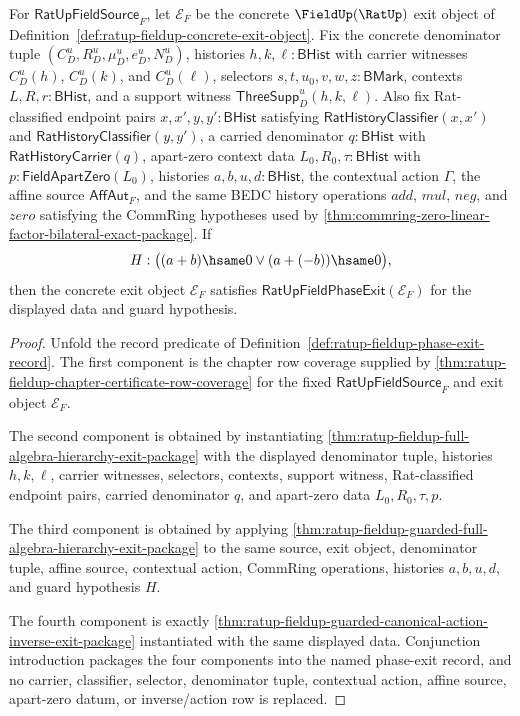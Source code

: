 \begin{theorem}
\label{thm:ratup-fieldup-canonical-phase-exit-record}
For $\mathsf{RatUpFieldSource}_F$, let $\mathcal E_F$ be the concrete
$\FieldUp(\RatUp)$ exit object of
Definition~\ref{def:ratup-fieldup-concrete-exit-object}. Fix the concrete
denominator tuple $(C_D^u,R_D^u,\mu_D^u,e_D^u,N_D^u)$, histories
$h,k,\ell:\mathsf{BHist}$ with carrier witnesses $C_D^u(h)$, $C_D^u(k)$, and
$C_D^u(\ell)$, selectors $s,t,u_0,v,w,z:\mathsf{BMark}$, contexts
$L,R,r:\mathsf{BHist}$, and a support witness
$\mathsf{ThreeSupp}_D^u(h,k,\ell)$. Also fix Rat-classified endpoint pairs
$x,x',y,y':\mathsf{BHist}$ satisfying
$\mathsf{RatHistoryClassifier}(x,x')$ and
$\mathsf{RatHistoryClassifier}(y,y')$, a carried denominator
$q:\mathsf{BHist}$ with $\mathsf{RatHistoryCarrier}(q)$, apart-zero context
data $L_0,R_0,\tau:\mathsf{BHist}$ with
$p:\mathsf{FieldApartZero}(L_0)$, histories $a,b,u,d:\mathsf{BHist}$, the
contextual action $\Gamma$, the affine source $\mathsf{AffAut}_F$, and the same
BEDC history operations $add$, $mul$, $neg$, and $zero$ satisfying the CommRing
hypotheses used by
\autoref{thm:commring-zero-linear-factor-bilateral-exact-package}. If
$$
H:\bigl((a+b)\hsame0 \lor (a+(-b))\hsame0\bigr),
$$
then the concrete exit object $\mathcal E_F$ satisfies
$\mathsf{RatUpFieldPhaseExit}(\mathcal E_F)$ for the displayed data and guard
hypothesis.
\end{theorem}
\begin{proof}
Unfold the record predicate of
Definition~\ref{def:ratup-fieldup-phase-exit-record}. The first component is
the chapter row coverage supplied by
\autoref{thm:ratup-fieldup-chapter-certificate-row-coverage} for the fixed
$\mathsf{RatUpFieldSource}_F$ and exit object $\mathcal E_F$.

The second component is obtained by instantiating
\autoref{thm:ratup-fieldup-full-algebra-hierarchy-exit-package} with the
displayed denominator tuple, histories $h,k,\ell$, carrier witnesses, selectors,
contexts, support witness, Rat-classified endpoint pairs, carried denominator
$q$, and apart-zero data $L_0,R_0,\tau,p$.

The third component is obtained by applying
\autoref{thm:ratup-fieldup-guarded-full-algebra-hierarchy-exit-package} to the
same source, exit object, denominator tuple, affine source, contextual action,
CommRing operations, histories $a,b,u,d$, and guard hypothesis $H$.

The fourth component is exactly
\autoref{thm:ratup-fieldup-guarded-canonical-action-inverse-exit-package}
instantiated with the same displayed data. Conjunction introduction packages the
four components into the named phase-exit record, and no carrier, classifier,
selector, denominator tuple, contextual action, affine source, apart-zero datum,
or inverse/action row is replaced.
\end{proof}

